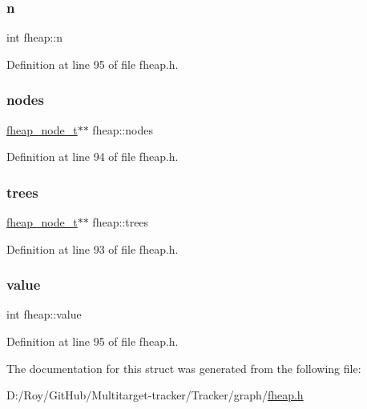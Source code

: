 \subsubsection{\texorpdfstring{n}{n}}
{\footnotesize\ttfamily int fheap\+::n}



Definition at line 95 of file fheap.\+h.

\mbox{\label{structfheap_ab78171d6b052efe35f0ff7f6d9fd8f99}} 
\subsubsection{\texorpdfstring{nodes}{nodes}}
{\footnotesize\ttfamily \mbox{\hyperlink{fheap_8h_a287241d6991f4f1027058c066fc7003e}{fheap\+\_\+node\+\_\+t}}$\ast$$\ast$ fheap\+::nodes}



Definition at line 94 of file fheap.\+h.

\mbox{\label{structfheap_afc06f9768708fb48c24e7a788c108fb7}} 
\subsubsection{\texorpdfstring{trees}{trees}}
{\footnotesize\ttfamily \mbox{\hyperlink{fheap_8h_a287241d6991f4f1027058c066fc7003e}{fheap\+\_\+node\+\_\+t}}$\ast$$\ast$ fheap\+::trees}



Definition at line 93 of file fheap.\+h.

\mbox{\label{structfheap_a04d7238a058ccbd0beb8e807d212f348}} 
\subsubsection{\texorpdfstring{value}{value}}
{\footnotesize\ttfamily int fheap\+::value}



Definition at line 95 of file fheap.\+h.



The documentation for this struct was generated from the following file\+:\begin{DoxyCompactItemize}
\item 
D\+:/\+Roy/\+Git\+Hub/\+Multitarget-\/tracker/\+Tracker/graph/\mbox{\hyperlink{fheap_8h}{fheap.\+h}}\end{DoxyCompactItemize}
